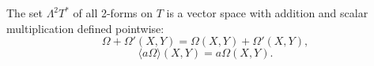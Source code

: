 The set $\Lambda^2 T^*$ of all 2-forms on $T$ is a vector space with addition and scalar multiplication defined pointwise:
$$\Omega + \Omega'(X, Y) = \Omega(X, Y) + \Omega'(X, Y),$$
$$\langle a\Omega \rangle(X, Y) = a\Omega(X, Y).$$
